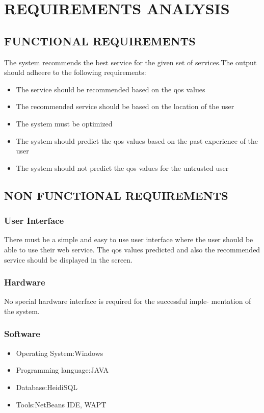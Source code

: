 
\chapter{REQUIREMENTS ANALYSIS} %

\section{FUNCTIONAL REQUIREMENTS}
 The system recommends the best service for the given set of services.The output should adheere to the following requirements:
\begin{itemize}
  \item The service should be recommended based on the qos values
  \item The recommended service should be based on the location of the user
  \item The system must be optimized
  \item The system should predict the qos values based on the past experience of the user
   \item The system should not predict the qos values for the untrusted user
\end{itemize}  
\section{NON FUNCTIONAL REQUIREMENTS}
\subsection{User Interface}
 There must be a simple and easy to use user interface where the user
should be able to use their web service. The qos values predicted and
also the recommended service should be displayed in the screen.
\subsection{Hardware}
  No special hardware interface is required for the successful imple-
mentation of the system.
\newpage
\subsection{Software}
\begin{itemize}
    \item Operating System:Windows
    \item Programming language:JAVA
    \item Database:HeidiSQL
    \item Tools:NetBeans IDE, WAPT
\end{itemize}
